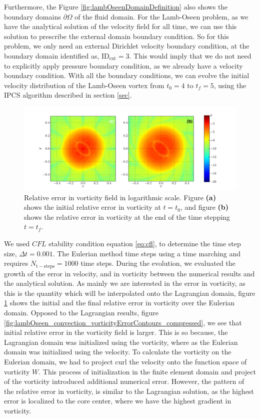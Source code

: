 Furthermore, the Figure \ref{fig:lambOseenDomainDefinition} also shows the boundary domains $\partial \Omega$ of the fluid domain. For the Lamb-Oseen problem, as we have the analytical solution of the velocity field for all time, we can use this solution to prescribe the external domain boundary condition. So for this problem, we only need an external Dirichlet velocity boundary condition, at the boundary domain identified as, $\mathrm{ID}_{\mathrm{ext}} = 3$. This would imply that we do not need to explicitly apply pressure boundary condition, as we already have a velocity boundary condition. With all the boundary conditions, we can evolve the initial velocity distribution of the Lamb-Oseen vortex from $t_0 = 4$ to $t_f =5$, using the IPCS algorithm described in section \ref{sec}. 

	\begin{figure}[b]
	\centering
	\includegraphics[width=0.8\linewidth]{./figures/eulerian/lambOseen_eulerian_wRelField_compressed.pdf}
	\caption{Relative error in vorticity field in logarithmic scale. Figure \textbf{(a)} shows the initial relative error in vorticity at $t=t_0$, and figure \textbf{(b)} shows the relative error in vorticity at the end of the time stepping $t=t_f$.}
	\label{fig:lambOseen_eulerian_wRelField_compressed}
	\end{figure}
	
We used $CFL$ stability condition equation \ref{eq:cfl}, to determine the time step size, $\Delta t = 0.001$. The Eulerian method time steps using a  time marching and requires $N_{\mathrm{t-steps}}=1000$ time steps. During the evolution, we evaluated the growth of the error in velocity, and in vorticity between the numerical results and the analytical solution. As mainly we are interested in the error in vorticity, as this is the quantity which will be interpolated onto the Lagrangian domain, figure \ref{fig:lambOseen_eulerian_wRelField_compressed} shows the initial and the final relative error in vorticity over the Eulerian domain. Opposed to the Lagrangian results, figure \ref{fig:lambOseen_convection_vorticityErrorContours_compressed}, we see that initial relative error in the vorticity field is larger. This is so because, the Lagrangian domain was initialized using the vorticity, where as the Eulerian domain was initialized using the velocity. To calculate the vorticity on the Eulerian domain, we had to project curl the velocity onto the function space of vorticity $W$. This process of initialization in the finite element domain and project of the vorticity introduced additional numerical error. However, the pattern of the relative error in vorticity, is similar to the Lagrangian solution, as the highest error is localized to the core center, where we have the highest gradient in vorticity.

